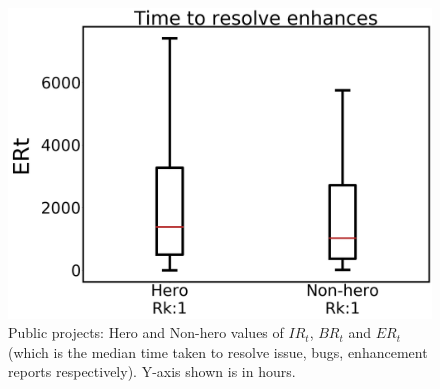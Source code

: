 \documentclass[sigconf]{acmart}
\theoremstyle{break}
\begin{document}
\begin{figure}[!t]
\begin{minipage}{.33\linewidth}
        \includegraphics[width=\linewidth]{./fig/ERt.png}
    \end{minipage}%
    \caption{Public projects: Hero and Non-hero values  of  $IR_t$, $BR_t$ and $ER_t$ (which is the median time taken to resolve issue, bugs, enhancement reports respectively). Y-axis shown is in hours.}
    \label{fig:resolution_public}
\end{figure}
\end{document}
